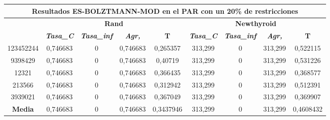 \documentclass[12pt, spanish]{article}
\begin{document}
\begin{table}[H]
\begin{tabular}{|c|c|c|c|c|c|c|c|c|}
\hline
\multicolumn{9}{|c|}{\textbf{Resultados ES-BOLZTMANN-MOD en el PAR con un 20\% de restricciones}}                                                                                                                 \\ \hline
\multirow{2}{*}{} & \multicolumn{4}{c|}{\textbf{Rand}}                                                            & \multicolumn{4}{c|}{\textbf{Newthyroid}}                                                      \\ \cline{2-9} 
                  & \textit{\textbf{Tasa\_C}} & \textit{\textbf{Tasa\_inf}} & \textit{\textbf{Agr,}} & \textbf{T} & \textit{\textbf{Tasa\_C}} & \textit{\textbf{Tasa\_inf}} & \textit{\textbf{Agr,}} & \textbf{T} \\ \hline
123452244         & 0,746683                  & 0                           & 0,746683               & 0,265357   & 313,299                   & 0                           & 313,299                & 0,522115   \\ \hline
9398429           & 0,746683                  & 0                           & 0,746683               & 0,40719    & 313,299                   & 0                           & 313,299                & 0,531226   \\ \hline
12321             & 0,746683                  & 0                           & 0,746683               & 0,366435   & 313,299                   & 0                           & 313,299                & 0,368577   \\ \hline
213566            & 0,746683                  & 0                           & 0,746683               & 0,312942   & 313,299                   & 0                           & 313,299                & 0,512391   \\ \hline
3939021           & 0,746683                  & 0                           & 0,746683               & 0,367049   & 313,299                   & 0                           & 313,299                & 0,369907   \\ \hline
\textbf{Media}    & 0,746683                  & 0                           & 0,746683               & 0,3437946  & 313,299                   & 0                           & 313,299                & 0,4608432  \\ \hline
\end{tabular}
\end{table}
\end{document}
